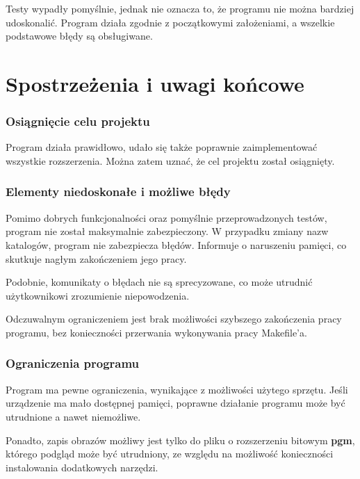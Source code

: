 \documentclass[a4paper]{article}
\begin{document}
\quad Testy wypad\l{}y pomy\'slnie, jednak nie oznacza to, \.ze programu nie mo\.zna bardziej udoskonali\'c.
Program dzia\l{}a zgodnie z pocz\k{a}tkowymi za\l{}o\.zeniami, a wszelkie podstawowe b\l{}\k{e}dy s\k{a} obs\l{}ugiwane.

\newpage

\part{Spostrze\.zenia i uwagi ko\'ncowe}

\section{Osi\k{a}gni\k{e}cie celu projektu}
\quad Program dzia\l{}a prawid\l{}owo, uda\l{}o si\k{e} tak\.ze poprawnie zaimplementowa\'c wszystkie rozszerzenia. 
Mo\.zna zatem uzna\'c, \.ze cel projektu zosta\l{} osi\k{a}gni\k{e}ty.

\section{Elementy niedoskona\l{}e i mo\.zliwe b\l{}\k{e}dy}
\quad Pomimo dobrych funkcjonalno\'sci oraz pomy\'slnie przeprowadzonych test\'ow, program nie zosta\l{} maksymalnie zabezpieczony.
W przypadku zmiany nazw katalog\'ow, program nie zabezpiecza b\l{}\k{e}d\'ow. 
Informuje o naruszeniu pami\k{e}ci, co skutkuje nag\l{}ym zako\'nczeniem jego pracy. 


Podobnie, komunikaty o b\l{}\k{e}dach nie s\k{a} sprecyzowane, co mo\.ze utrudni\'c u\.zytkownikowi zrozumienie niepowodzenia. 


Odczuwalnym ograniczeniem jest brak mo\.zliwo\'sci szybszego zako\'nczenia pracy programu, bez konieczno\'sci przerwania wykonywania pracy Makefile'a.

\section{Ograniczenia programu}
\quad Program ma pewne ograniczenia, wynikaj\k{a}ce z mo\.zliwo\'sci u\.zytego sprz\k{e}tu. 
Je\'sli urz\k{a}dzenie ma ma\l{}o dost\k{e}pnej pami\k{e}ci, poprawne dzia\l{}anie programu mo\.ze by\'c utrudnione a nawet niemo\.zliwe.


Ponadto, zapis obraz\'ow mo\.zliwy jest tylko do pliku o rozszerzeniu bitowym \textbf{pgm}, kt\'orego podgl\k{a}d mo\.ze by\'c utrudniony, 
ze wzgl\k{e}du na mo\.zliwo\'s\'c konieczno\'sci instalowania dodatkowych narz\k{e}dzi.
\end{document}

